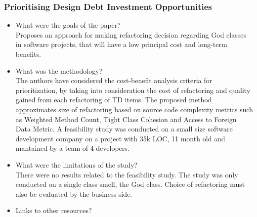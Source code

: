 \documentclass{mprop}
\begin{document}
\subsubsection{Prioritising Design Debt Investment Opportunities} \cite{Zazworka2011Prioritise}
\begin{itemize}
	\item What were the goals of the paper? \\
	      Proposes an approach for making refactoring decision regarding God classes in software projects, that will have a low principal cost and long-term benefits.
	\item What was the methodology? \\
	      The authors have considered the cost-benefit analysis criteria for prioritization, by taking into consideration the cost of refactoring and quality gained from each refactoring of TD items.
	      The proposed method approximates size of refactoring based on source code complexity metrics such as Weighted Method Count, Tight Class Cohesion and Access to Foreign Data Metric.
	      A feasibility study was conducted on a small size software development company on a project with 35k LOC, 11 month old and mantained by a team of 4 developers.
	\item What were the limitations of the study? \\
	      There were no results related to the feasibility study.
	      The study was only conducted on a single class smell, the God class.
	      Choice of refactoring must also be evaluated by the business side.
	\item Links to other resources? \\
\end{itemize}
\end{document}
